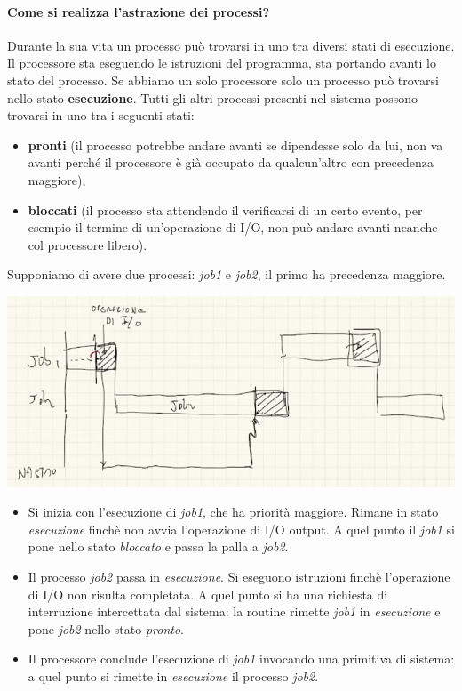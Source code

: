 \paragraph{Come si realizza l'astrazione dei processi?}
Durante la sua vita un processo può trovarsi in uno tra diversi stati di esecuzione. Il processore sta eseguendo le istruzioni del programma, sta portando avanti lo stato del processo.  Se abbiamo un solo processore solo un processo può trovarsi nello stato \textbf{esecuzione}. Tutti gli altri processi presenti nel sistema possono trovarsi in uno tra i seguenti stati:
\begin{itemize}
	\item \textbf{pronti} (il processo potrebbe andare avanti se dipendesse solo da lui, non va avanti perché il processore è già occupato da qualcun'altro con precedenza maggiore),
	\item \textbf{bloccati} (il processo sta attendendo il verificarsi di un certo evento, per esempio il termine di un'operazione di I/O, non può andare avanti neanche col processore libero).
\end{itemize}
Supponiamo di avere due processi: \emph{job1} e \emph{job2}, il primo ha precedenza maggiore.
\begin{center}\includegraphics[scale=.75]{img/127.PNG}\end{center}
\begin{itemize}
	\item Si inizia con l'esecuzione di \emph{job1}, che ha priorità maggiore. Rimane in stato \emph{esecuzione} finchè non avvia l'operazione di I/O output. A quel punto il \emph{job1} si pone nello stato \emph{bloccato} e passa la palla a \emph{job2}.
	\item Il processo \emph{job2} passa in \emph{esecuzione}. Si eseguono istruzioni finchè l'operazione di I/O non risulta completata. A quel punto si ha una richiesta di interruzione intercettata dal sistema: la routine rimette \emph{job1} in \emph{esecuzione} e pone \emph{job2} nello stato \emph{pronto}.
	\item Il processore conclude l'esecuzione di \emph{job1} invocando una primitiva di sistema: a quel punto si rimette in \emph{esecuzione} il processo \emph{job2}.
\end{itemize}
